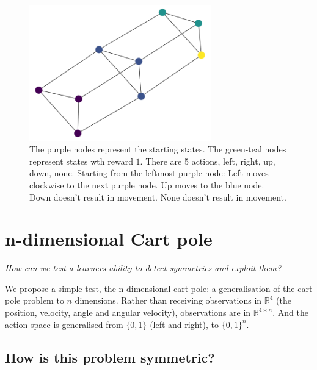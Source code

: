 \begin{figure}[h!]
  \centering
  \includegraphics[width=0.7\textwidth,height=0.35\textheight]{../../pictures/figures/race-mdp-puzzle-n3.png}
  \caption{The purple nodes represent the starting states. The green-teal nodes represent states wth reward $1$. There are 5 actions, left, right, up, down, none.
	Starting from the leftmost purple node: Left moves clockwise to the next purple node. Up moves to the blue node. Down doesn't result in movement. None doesn't result in movement.}
\end{figure}

\newpage
\section{n-dimensional Cart pole}\label{action-space-experiments}

\begin{displayquote}
  \textit{How can we test a learners ability to detect symmetries and exploit them?}
\end{displayquote}

We propose a simple test, the n-dimensional cart pole: a generalisation of the
cart pole problem to $n$ dimensions. Rather than receiving observations in
$\mathbb{R}^4$ (the position, velocity, angle and angular velocity), observations are
in $\mathbb{R}^{4\times n}$. And the action space is generalised from $\{0,1\}$ (left and right),
to $\{0,1\}^{n}$.


\subsection{How is this problem symmetric?}

